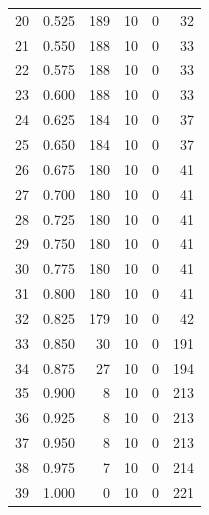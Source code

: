 \documentclass[a4paper,twoside,12pt]{book}
\begin{document}
\begin{appendices}
\begin{table}
\begin{tabular}{lrrrrr}
		20 &  0.525 &       189 &        10 &               0 &              32 \\
		21 &  0.550 &       188 &        10 &               0 &              33 \\
		22 &  0.575 &       188 &        10 &               0 &              33 \\
		23 &  0.600 &       188 &        10 &               0 &              33 \\
		24 &  0.625 &       184 &        10 &               0 &              37 \\
		25 &  0.650 &       184 &        10 &               0 &              37 \\
		26 &  0.675 &       180 &        10 &               0 &              41 \\
		27 &  0.700 &       180 &        10 &               0 &              41 \\
		28 &  0.725 &       180 &        10 &               0 &              41 \\
		29 &  0.750 &       180 &        10 &               0 &              41 \\
		30 &  0.775 &       180 &        10 &               0 &              41 \\
		31 &  0.800 &       180 &        10 &               0 &              41 \\
		32 &  0.825 &       179 &        10 &               0 &              42 \\
		33 &  0.850 &        30 &        10 &               0 &             191 \\
		34 &  0.875 &        27 &        10 &               0 &             194 \\
		35 &  0.900 &         8 &        10 &               0 &             213 \\
		36 &  0.925 &         8 &        10 &               0 &             213 \\
		37 &  0.950 &         8 &        10 &               0 &             213 \\
		38 &  0.975 &         7 &        10 &               0 &             214 \\
		39 &  1.000 &         0 &        10 &               0 &             221 \\
		\bottomrule
	\end{tabular}
\end{table} 


\end{appendices}
\end{document}
